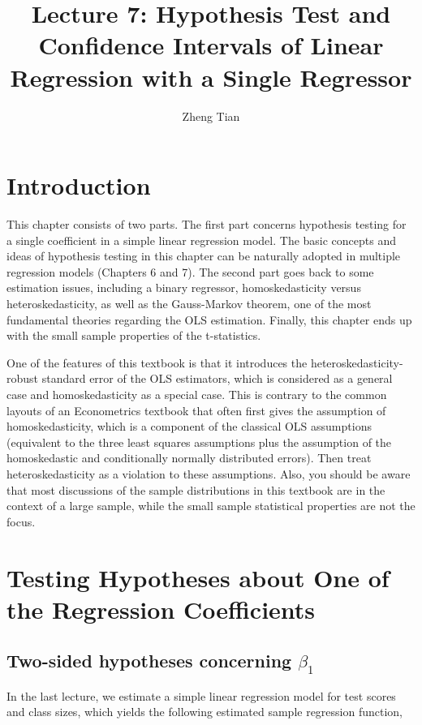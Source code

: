 \documentclass[a4paper,11pt]{article}
\author{Zheng Tian}
\date{}
\title{Lecture 7: Hypothesis Test and Confidence Intervals of Linear Regression with a Single Regressor}
\begin{document}
\maketitle
\setcounter{tocdepth}{1}
\tableofcontents



\section{Introduction}
\label{sec:org6f94b8a}

This chapter consists of two parts. The first part concerns hypothesis
testing for a single coefficient in a simple linear regression
model. The basic concepts and ideas of hypothesis testing in this
chapter can be naturally adopted in multiple regression models
(Chapters 6 and 7). The second part goes back to some estimation
issues, including a binary regressor, homoskedasticity versus
heteroskedasticity, as well as the Gauss-Markov theorem, one of the
most fundamental theories regarding the OLS estimation. Finally,
this chapter ends up with the small sample properties of the
t-statistics.

One of the features of this textbook is that it introduces the
heteroskedasticity-robust standard error of the OLS estimators, which
is considered as a general case and homoskedasticity as a special
case. This is contrary to the common layouts of an Econometrics
textbook that often first gives the assumption of homoskedasticity,
which is a component of the classical OLS assumptions (equivalent to
the three least squares assumptions plus the assumption of the
homoskedastic and conditionally normally distributed errors). Then
treat heteroskedasticity as a violation to these assumptions. Also,
you should be aware that most discussions of the sample distributions
in this textbook are in the context of a large sample, while the small
sample statistical properties are not the focus.


\section{Testing Hypotheses about One of the Regression Coefficients}
\label{sec:orgb787064}

\subsection{Two-sided hypotheses concerning \(\beta_1\)}
\label{sec:org5682048}

In the last lecture, we estimate a simple linear regression model for test
scores and class sizes, which yields the following estimated sample
regression function,
\end{document}
